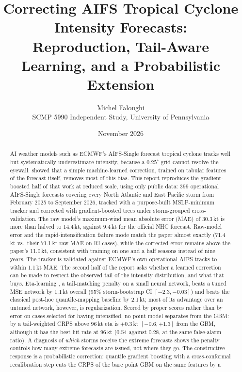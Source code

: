 \documentclass[11pt]{article}
\title{Correcting AIFS Tropical Cyclone Intensity Forecasts:\\
Reproduction, Tail-Aware Learning, and a Probabilistic Extension}
\author{Michel Faloughi\\ \small SCMP 5990 Independent Study, University of Pennsylvania}
\date{November 2026}
\begin{document}
\maketitle

\begin{abstract}
AI weather models such as ECMWF's AIFS-Single forecast tropical cyclone tracks well but
systematically underestimate intensity, because a $0.25^{\circ}$ grid cannot resolve the eyewall.
\citet{allen2026aifstc} showed that a simple machine-learned correction, trained on tabular features
of the forecast itself, removes most of this bias. This report reproduces the gradient-boosted half
of that work at reduced scale, using only public data: 399 operational AIFS-Single forecasts
covering every North Atlantic and East Pacific storm from February 2025 to September 2026, tracked
with a purpose-built MSLP-minimum tracker and corrected with gradient-boosted trees under
storm-grouped cross-validation. The raw model's maximum-wind mean absolute error (MAE) of
30.3\,kt is more than halved to 14.4\,kt, against 9.4\,kt for the official NHC forecast.
Raw-model error and the rapid-intensification failure mode match the paper almost exactly
(71.4\,kt vs.\ their 71.1\,kt raw MAE on RI cases), while the corrected error remains above the
paper's 11.0\,kt, consistent with training on one and a half seasons instead of nine years.
The tracker is validated against ECMWF's own operational AIFS tracks to within 1.1\,kt MAE.
The second half of the report asks whether a learned correction can be made to respect the
observed tail of the intensity distribution, and what that buys. Eta-learning
\citep{chang2026eta}, a tail-matching penalty on a small neural network, beats a tuned MSE network
by 1.1\,kt overall (95\% storm-bootstrap CI $[-2.3, -0.03]$) and beats the classical post-hoc
quantile-mapping baseline by 2.1\,kt; most of its advantage over an untuned network, however, is
regularization. Scored by proper scores rather than by error on cases selected for having
intensified, no point model separates from the GBM: by a tail-weighted CRPS above 96\,kt eta is
$+0.3$\,kt $[-0.6, +1.3]$ from the GBM, although it has the best hit rate at 96\,kt (0.54 against
0.28, at the same false-alarm ratio). A diagnosis of \emph{which} storms receive the extreme
forecasts shows the penalty controls how many extreme forecasts are issued, not where they go.
The constructive response is a probabilistic correction: quantile gradient boosting with a
cross-conformal recalibration step cuts the CRPS of the bare point GBM on the same features by a

\end{abstract}
\end{document}
